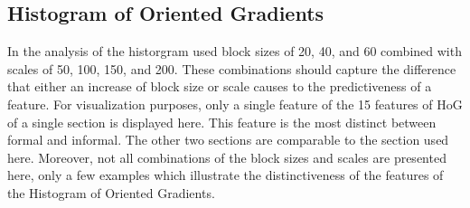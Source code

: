 

\subsection{Histogram of Oriented Gradients}

In the analysis of the historgram used block sizes of 20, 40, and 60 combined
with scales of 50, 100, 150, and 200. These combinations should capture the
difference that either an increase of block size or scale causes to the
predictiveness of a feature. For visualization purposes, only a single feature
of the 15 features of HoG of a single section is displayed here. This feature
is the most distinct between formal and informal. The other two sections are
comparable to the section used here. Moreover, not all combinations of the
block sizes and scales are presented here, only a few examples which illustrate
the distinctiveness of the features of the Histogram of Oriented Gradients.

